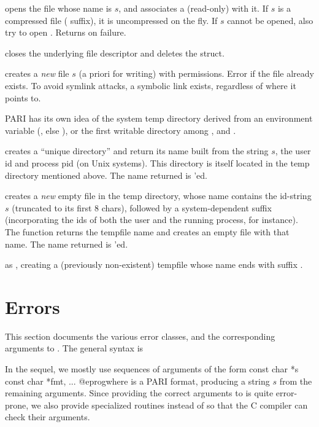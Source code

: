  opens the file whose name is
$s$,  and associates a (read-only)  with it. If $s$ is a
compressed file ( suffix), it is uncompressed on the fly.
If $s$ cannot be opened, also try to open . Returns 
on failure.

 closes
the underlying file descriptor and deletes the  struct.

creates a \emph{new} file $s$ (a priori for writing) with 
permissions. Error if the file already exists. To avoid symlink attacks,
a symbolic link exists, regardless of where it points to.


PARI has its own idea of the system temp directory derived from an
environment variable (, else ), or the first
writable directory among ,  and .

 creates a ``unique directory''
and return its name built from the string $s$, the user id and process pid
(on Unix systems). This directory is itself located in the temp
directory mentioned above. The name returned is 'ed.

 creates a \emph{new} empty
file in the temp directory, whose name contains the id-string $s$ (truncated
to its first $8$ chars), followed by a system-dependent suffix (incorporating
the ids of both the user and the running process, for instance). The function
returns the tempfile name and creates an empty file with that name. The name
returned is 'ed.

as , creating a (previously non-existent)
tempfile whose name ends with suffix .

\section{Errors}\label{se:errors}

This section documents the various error classes, and the corresponding
arguments to . The general syntax is


\noindent In the sequel, we mostly use sequences of arguments of the form
\bprog
  const char *s
  const char *fmt, ...
@eprog\noindent where  is a PARI
format, producing a string $s$ from the remaining arguments. Since
providing the correct arguments to  is quite error-prone, we
also provide specialized routines 
instead of  so that the C compiler
can check their arguments.

